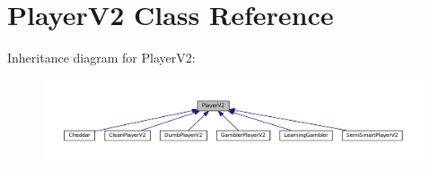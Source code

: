 \hypertarget{classPlayerV2}{}\section{Player\+V2 Class Reference}
\label{classPlayerV2}


Inheritance diagram for Player\+V2\+:\nopagebreak
\begin{figure}[H]
\begin{center}
\leavevmode
\includegraphics[width=350pt]{classPlayerV2__inherit__graph}
\end{center}
\end{figure}
